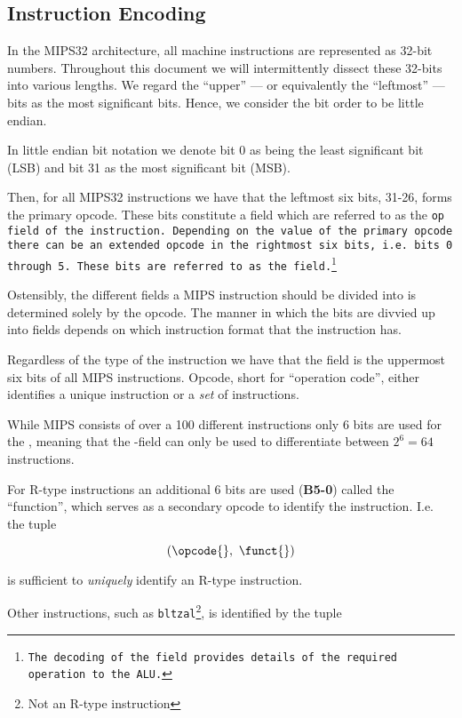 \subsection{Instruction Encoding}

In the MIPS32 architecture, all machine instructions are represented
as 32-bit numbers. Throughout this document we will intermittently
dissect these 32-bits into various lengths. We regard the ``upper''
--- or equivalently the ``leftmost'' --- bits as the most significant
bits. Hence, we consider the bit order to be little endian.

In little endian bit notation we denote bit 0 as being the least
significant bit (LSB) and bit 31 as the most significant bit (MSB).

Then, for all MIPS32 instructions we have that the leftmost six bits,
31-26, forms the primary opcode. These bits constitute a field which
are referred to as the \tt{op} field of the instruction.
Depending on the value of the primary opcode there can be an extended
opcode in the rightmost six bits, i.e. bits 0 through 5.  These bits
are referred to as the \funct{} field.\footnote{The decoding of
  the \funct{} field provides details of the required operation
  to the \tt{ALU}.}

Ostensibly, the different fields a MIPS instruction should be divided
into is determined solely by the opcode. The manner in which the bits
are divvied up into fields depends on which instruction format that
the instruction has.

Regardless of the type of the instruction we have that the
\opcode{} field is the uppermost six bits of all MIPS
instructions. Opcode, short for ``operation code'', either identifies
a unique instruction or a \emph{set} of instructions.

While MIPS consists of over a 100 different instructions only 6 bits
are used for the \opcode{}, meaning that the
\opcode{}-field can only be used to differentiate between
$2^6=64$ instructions. 

For R-type instructions an additional 6 bits are used (\textbf{B5-0})
called the ``function'', which serves as a secondary opcode to
identify the instruction. I.e. the tuple

\begin{equation*}
(\opcode{},\ \funct{})
\end{equation*}

is sufficient to \emph{uniquely} identify an R-type instruction.

Other instructions, such as \texttt{bltzal}\footnote{Not an R-type
instruction}, is identified by the tuple

